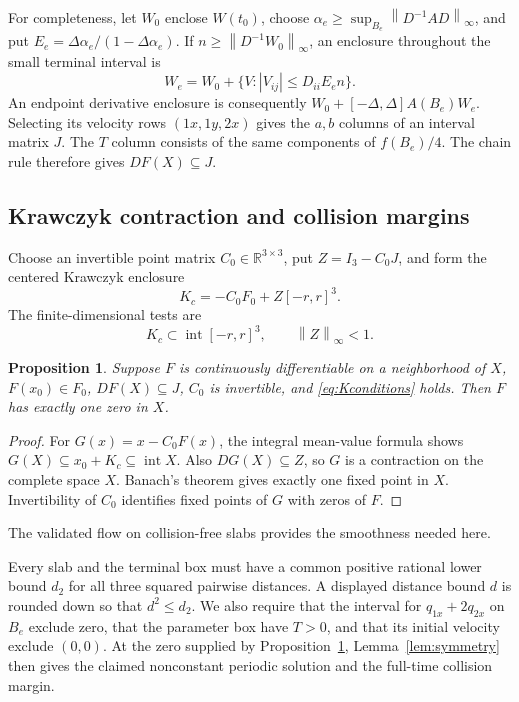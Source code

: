 \documentclass[10pt,a4paper]{article}
\newtheorem{proposition}[theorem]{Proposition}
\theoremstyle{remark}
\newcommand{\R}{\mathbb R}
\newcommand{\norm}[1]{\left\lVert #1\right\rVert_\infty}
\newcommand{\abs}[1]{\left|#1\right|}
\begin{document}
For completeness, let $W_0$ enclose $W(t_0)$, choose
$\alpha_e\ge\sup_{B_e}\norm{D^{-1}AD}$, and put
$E_e=\Delta\alpha_e/(1-\Delta\alpha_e)$. If
$n\ge\norm{D^{-1}W_0}$, an enclosure throughout the small terminal
interval is
\[
 W_e=W_0+\{V:\abs{V_{ij}}\le D_{ii}E_en\}.
\]
An endpoint derivative enclosure is consequently
$W_0+[-\Delta,\Delta]A(B_e)W_e$. Selecting its velocity rows
$(1x,1y,2x)$ gives the $a,b$ columns of an interval matrix $J$.
The $T$ column consists of the same components of $f(B_e)/4$.
The chain rule therefore gives $DF(X)\subseteq J$.

\subsection{Krawczyk contraction and collision margins}
Choose an invertible point matrix $C_0\in\R^{3\times3}$, put
$Z=I_3-C_0J$, and form the centered Krawczyk enclosure
\begin{equation}
 K_c=-C_0F_0+Z[-r,r]^3.
 \label{eq:Krawczyk}
\end{equation}
The finite-dimensional tests are
\begin{equation}
 K_c\subset\operatorname{int}[-r,r]^3,\qquad \norm{Z}<1.
 \label{eq:Kconditions}
\end{equation}

\begin{proposition}
\label{prop:contraction}
Suppose $F$ is continuously differentiable on a neighborhood of $X$,
$F(x_0)\in F_0$, $DF(X)\subseteq J$, $C_0$ is invertible, and
\eqref{eq:Kconditions} holds. Then $F$ has exactly one zero in $X$.
\end{proposition}
\begin{proof}
For $G(x)=x-C_0F(x)$, the integral mean-value formula shows
$G(X)\subseteq x_0+K_c\subseteq\operatorname{int}X$.
Also $DG(X)\subseteq Z$, so $G$ is a contraction on the complete
space $X$. Banach's theorem gives exactly one fixed point in $X$.
Invertibility of $C_0$ identifies fixed points of $G$ with zeros of $F$.
\end{proof}

The validated flow on collision-free slabs provides the smoothness
needed here.

Every slab and the terminal box must have a common positive rational
lower bound $d_2$ for all three squared pairwise distances. A displayed
distance bound $d$ is rounded down so that $d^2\le d_2$. We also require
that the interval for $q_{1x}+2q_{2x}$ on $B_e$ exclude zero, that the
parameter box have $T>0$, and that its initial velocity exclude
$(0,0)$. At the zero supplied by Proposition~\ref{prop:contraction},
Lemma~\ref{lem:symmetry} then gives the claimed nonconstant periodic
solution and the full-time collision margin.
\end{document}
